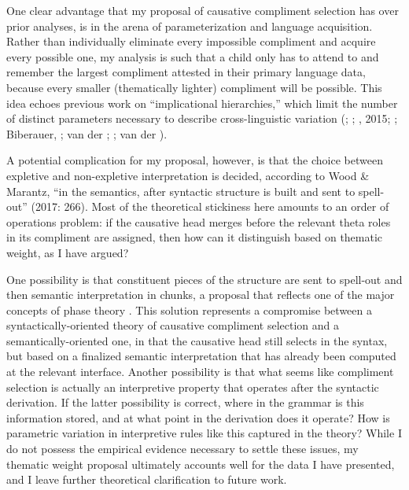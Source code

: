 \documentclass[output=paper]{langscibook}
\begin{document}
One clear advantage that my proposal of causative compliment selection has over prior analyses, is in the arena of parameterization and language acquisition. Rather than individually eliminate every impossible compliment and acquire every possible one, my analysis is such that a child only has to attend to and remember the largest compliment attested in their primary language data, because every smaller (thematically lighter) compliment will be possible. This idea echoes previous work on “implicational hierarchies,” which limit the number of distinct parameters necessary to describe cross-linguistic variation (\citealt{HolmbergRoberts2009}; \citealt{Biberauer2011}; \citealt{BiberauerRoberts2012}, 2015; \citealt{Sheehan2013}; Biberauer, \citealt{RobertsSheehan2013}; van der \citealt{WalBiberauer2014}; \citealt{BiberauerEtAl2014}; van der \citealt{Wal2017}).

A potential complication for my proposal, however, is that the choice between expletive and non-expletive interpretation is decided, according to Wood \& Marantz, “in the semantics, after syntactic structure is built and sent to spell-out” (2017: 266). Most of the theoretical stickiness here amounts to an order of operations problem: if the causative head merges before the relevant theta roles in its compliment are assigned, then how can it distinguish based on thematic weight, as I have argued? 


One possibility is that constituent pieces of the structure are sent to spell-out and then semantic interpretation in chunks, a proposal that reflects one of the major concepts of phase theory \citep{Chomsky1999}. This solution represents a compromise between a syntactically-oriented theory of causative compliment selection and a semantically-oriented one, in that the causative head still selects in the syntax, but based on a finalized semantic interpretation that has already been computed at the relevant interface. Another possibility is that what seems like compliment selection is actually an interpretive property that operates after the syntactic derivation. If the latter possibility is correct, where in the grammar is this information stored, and at what point in the derivation does it operate? How is parametric variation in interpretive rules like this captured in the theory? While I do not possess the empirical evidence necessary to settle these issues, my thematic weight proposal ultimately accounts well for the data I have presented, and I leave further theoretical clarification to future work. 
\end{document}
